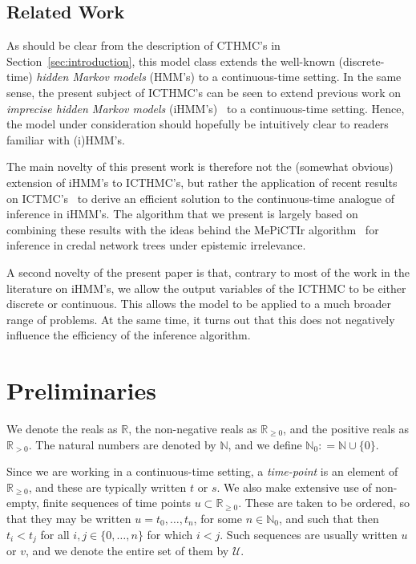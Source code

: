 \documentclass[twoside,11pt]{article}
\newcommand{\nats}{\mathbb{N}}
\newcommand{\natswith}{\nats_{0}}
\newcommand{\reals}{\mathbb{R}}
\newcommand{\realspos}{\reals_{>0}}
\newcommand{\realsnonneg}{\reals_{\geq 0}}
\newcommand{\coloneqq}{:\!=}
\begin{document}
\subsection{Related Work}\label{sec:related}

As should be clear from the description of CTHMC's in Section~\ref{sec:introduction}, this model class extends the well-known (discrete-time) \emph{hidden Markov models} (HMM's) to a continuous-time setting. In the same sense, the present subject of ICTHMC's can be seen to extend previous work on \emph{imprecise hidden Markov models} (iHMM's)~\citep{deCooman:2010gd} to a continuous-time setting. Hence, the model  under consideration should hopefully be intuitively clear to readers familiar with (i)HMM's. 

The main novelty of this present work is therefore not the (somewhat obvious) extension of iHMM's to ICTHMC's, but rather the application of recent results on ICTMC's~\citep{krak2016ictmc} to derive an efficient solution to the continuous-time analogue of inference in iHMM's. The algorithm that we present is largely based on combining these results with the ideas behind the MePiCTIr algorithm~\citep{deCooman:2010gd} for inference in credal network trees under epistemic irrelevance.

A second novelty of the present paper is that, contrary to most of the work in the literature on iHMM's, we allow the output variables of the ICTHMC to be either discrete or continuous. This allows the model to be applied to a much broader range of problems. At the same time, it turns out that this does not negatively influence the efficiency of the inference algorithm.

\section{Preliminaries}\label{sec:prelim}

We denote the reals as $\reals$, the non-negative reals as $\realsnonneg$, and the positive reals as $\realspos$. The natural numbers are denoted by $\nats$, and we define $\natswith\coloneqq\nats\cup\{0\}$.

Since we are working in a continuous-time setting, a \emph{time-point} is an element of $\realsnonneg$, and these are typically written $t$ or $s$. We also make extensive use of non-empty, finite sequences of time points $u\subset\realsnonneg$. These are taken to be ordered, so that they may be written $u=t_0,\ldots,t_n$, for some $n\in\natswith$, and such that then $t_i<t_j$ for all $i,j\in\{0,\ldots,n\}$ for which $i< j$. Such sequences are usually written $u$ or $v$, and we denote the entire set of them by $\mathcal{U}$.
\end{document}
